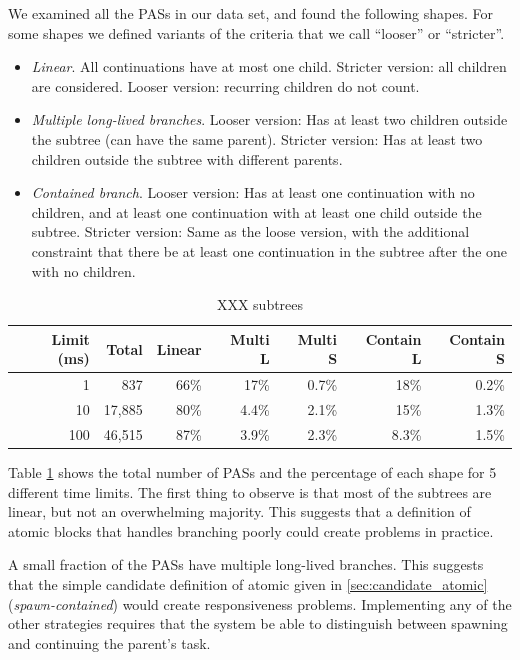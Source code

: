 \documentclass[acmsmall,anonymous,review]{acmart}\settopmatter{printfolios=true,printccs=false,printacmref=false}
\begin{document}
We examined all the PASs in our data set, and found the following shapes.
For some shapes we defined variants of the criteria that we call ``looser'' or ``stricter''.

\begin{itemize}
\item \emph{Linear}. All continuations have at most one child.
  Stricter version: all children are considered.
  Looser version: recurring children do not count.
\item \emph{Multiple long-lived branches}. Looser version: Has at least two children outside the subtree (can have the same parent).
Stricter version: Has at least two children outside the subtree with different parents.
\item \emph{Contained branch}. Looser version: Has at least one continuation with no children, and at least one continuation with at least one child outside the subtree.
  Stricter version: Same as the loose version, with the additional constraint that there be at least one continuation in the subtree after the one with no children.
\end{itemize}

\begin{table}
  \centering
  \begin{tabular}{|r|r|r|r|r|r|r|}
    \hline
    Limit (ms) &  Total & Linear & Multi L & Multi S & Contain L & Contain S \\
    \hline
    1          &    837 &   66\% &    17\% &   0.7\% &      18\% &     0.2\% \\
    \hline
    10         & 17,885 &   80\% &   4.4\% &   2.1\% &      15\% &     1.3\% \\
    \hline
    100        & 46,515 &   87\% &   3.9\% &   2.3\% &     8.3\% &     1.5\% \\
    \hline
  \end{tabular}
  \caption{XXX subtrees}
  \label{table:subtrees}
\end{table}

Table \ref{table:subtrees} shows the total number of PASs and the percentage of each shape for 5 different time limits.
The first thing to observe is that most of the subtrees are linear, but not an overwhelming majority.
This suggests that a definition of atomic blocks that handles branching poorly could create problems in practice.

A small fraction of the PASs have multiple long-lived branches.
This suggests that the simple candidate definition of atomic given in \textsection\ref{sec:candidate_atomic} (\emph{spawn-contained}) would create responsiveness problems.
Implementing any of the other strategies requires that the system be able to distinguish between spawning and continuing the parent's task.
\end{document}
